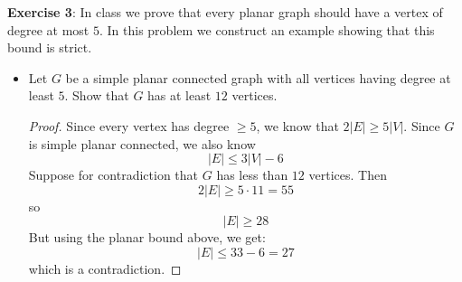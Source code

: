 \documentclass{article}
\begin{document}
\textbf{Exercise 3}: In class we prove that every planar graph should have a vertex of degree at most $5$. In this problem we construct an example showing that this bound is strict.
    \begin{itemize}
        \item Let $G$ be a simple planar connected graph with all vertices having degree at least $5$. Show that $G$ has at least $12$ vertices.
            \begin{proof}
                Since every vertex has degree $\geq 5$, we know that $2\lvert E \rvert \geq 5\lvert V \rvert$. Since $G$ is simple planar connected, we also know
                    \begin{equation*}
                        \lvert E \rvert \leq  3\lvert  V \rvert - 6
                    \end{equation*}
                Suppose for contradiction that $G$ has less than $12$ vertices. Then 
                    \begin{equation*}
                        2\lvert E \rvert \geq 5 \cdot 11 = 55
                    \end{equation*}
                so 
                    \begin{equation*}
                        \lvert E \rvert \geq 28
                    \end{equation*}
                But using the planar bound above, we get:
                    \begin{equation*}
                        \lvert E \rvert \leq 33 - 6 = 27
                    \end{equation*}
                which is a contradiction.
            \end{proof}


\end{itemize}
\end{document}
